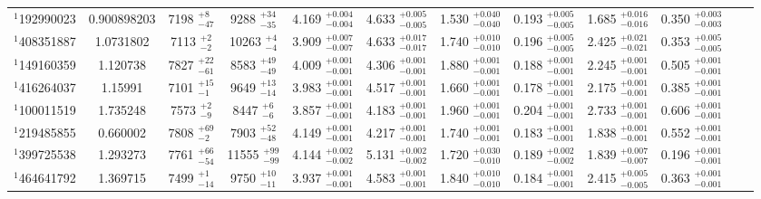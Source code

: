 \begin{table}[htbp]
\begin{tabular}{lccccccccccc}
$^{1}$192990023 & 0.900898203 & 7198 $^{+ 8 }_{- 47 }$& 9288 $^{+ 34 }_{- 35 }$& 4.169 $^{+ 0.004  }_{- 0.004  }$& 4.633 $^{+ 0.005  }_{- 0.005  }$& 1.530  $^{+ 0.040  }_{- 0.040  }$& 0.193  $^{+ 0.005  }_{- 0.005  }$& 1.685  $^{+ 0.016  }_{- 0.016  }$& 0.350  $^{+ 0.003  }_{- 0.003}$\\
$^{1}$408351887 & 1.0731802 & 7113 $^{+ 2 }_{- 2 }$& 10263 $^{+ 4 }_{- 4 }$& 3.909 $^{+ 0.007}_{- 0.007}$& 4.633 $^{+ 0.017  }_{- 0.017  }$& 1.740  $^{+ 0.010  }_{- 0.010  }$& 0.196  $^{+ 0.005  }_{- 0.005}$& 2.425  $^{+ 0.021  }_{- 0.021  }$& 0.353  $^{+ 0.005  }_{- 0.005}$\\
$^{1}$149160359 & 1.120738 & 7827 $^{+ 22 }_{- 61 }$& 8583 $^{+ 49 }_{- 49 }$& 4.009 $^{+ 0.001  }_{- 0.001  }$& 4.306 $^{+ 0.001  }_{- 0.001  }$& 1.880  $^{+ 0.001  }_{- 0.001  }$& 0.188  $^{+ 0.001  }_{- 0.001  }$& 2.245  $^{+ 0.001  }_{- 0.001  }$& 0.505  $^{+ 0.001  }_{- 0.001}$\\
$^{1}$416264037 & 1.15991 & 7101 $^{+ 15 }_{- 1 }$& 9649 $^{+ 13 }_{- 14 }$& 3.983 $^{+ 0.001}_{- 0.001}$& 4.517 $^{+ 0.001  }_{- 0.001  }$& 1.660  $^{+ 0.001  }_{- 0.001  }$& 0.178  $^{+ 0.001  }_{- 0.001}$& 2.175  $^{+ 0.001  }_{- 0.001  }$& 0.385  $^{+ 0.001  }_{- 0.001}$\\
$^{1}$100011519 & 1.735248 & 7573 $^{+ 2}_{- 9 }$& 8447 $^{+ 6 }_{- 6 }$& 3.857 $^{+ 0.001  }_{- 0.001  }$& 4.183 $^{+ 0.001  }_{- 0.001  }$& 1.960  $^{+ 0.001  }_{- 0.001  }$& 0.204  $^{+ 0.001  }_{- 0.001  }$& 2.733  $^{+ 0.001  }_{- 0.001  }$& 0.606  $^{+ 0.001  }_{- 0.001}$\\
$^{1}$219485855 & 0.660002 & 7808 $^{+ 69 }_{- 2 }$& 7903 $^{+ 52 }_{- 48 }$& 4.149 $^{+ 0.001}_{- 0.001}$& 4.217 $^{+ 0.001  }_{- 0.001}$& 1.740  $^{+ 0.001  }_{- 0.001 }$& 0.183  $^{+ 0.001  }_{- 0.001}$& 1.838  $^{+ 0.001  }_{- 0.001  }$& 0.552  $^{+ 0.001  }_{- 0.001}$\\
$^{1}$399725538 & 1.293273 & 7761 $^{+ 66 }_{- 54 }$& 11555 $^{+ 99 }_{- 99 }$& 4.144 $^{+ 0.002  }_{- 0.002  }$& 5.131 $^{+ 0.002  }_{- 0.002  }$& 1.720  $^{+ 0.030  }_{- 0.010  }$& 0.189  $^{+ 0.002  }_{- 0.002  }$& 1.839 $^{+ 0.007  }_{- 0.007}$& 0.196  $^{+ 0.001  }_{- 0.001}$\\
$^{1}$464641792 & 1.369715 & 7499 $^{+ 1 }_{- 14 }$& 9750 $^{+ 10 }_{- 11 }$& 3.937 $^{+ 0.001}_{- 0.001}$& 4.583 $^{+ 0.001  }_{- 0.001  }$& 1.840  $^{+ 0.010  }_{- 0.010 }$& 0.184  $^{+ 0.001  }_{- 0.001}$& 2.415  $^{+ 0.005  }_{- 0.005  }$& 0.363  $^{+ 0.001  }_{- 0.001}$\\


\end{tabular}
\end{table}

